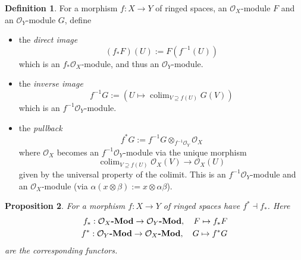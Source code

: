 \documentclass{scrartcl}
\newcommand{\Mod}[1]{\text{\textbf{$#1$-Mod}}}
\renewcommand{\O}{\mathcal{O}}
\DeclareMathOperator*{\colim}{colim}
\newtheorem{prop}{Proposition}[section]
\theoremstyle{definition}
\newtheorem{definition}[prop]{Definition}
\begin{document}
\begin{definition}
    For a morphism $f: X \to Y$ of ringed spaces, an $\O_X$-module $F$ and an $\O_Y$-module $G$, define
    \begin{itemize}
        \item the \emph{direct image}
        \begin{equation*}
            (f_*F)(U) := F(f^{-1}(U))
        \end{equation*}
        which is an $f_*\O_X$-module, and thus an $\O_Y$-module.
        \item the \emph{inverse image}
        \begin{equation*}
            f^{-1}G := \left( U \mapsto \colim_{V \supseteq f(U)} G(V) \right)
        \end{equation*}
        which is an $f^{-1}\O_Y$-module.
        \item the \emph{pullback}
        \begin{equation*}
            f^*G := f^{-1}G \otimes_{f^{-1}\O_Y} \O_X
        \end{equation*}
        where $\O_X$ becomes an $f^{-1}\O_Y$-module via the unique morphism
        \begin{equation*}
            \colim_{V \supseteq f(U)} \O_X(V) \to \O_X(U)
        \end{equation*}
        given by the universal property of the colimit.
        This is an $f^{-1}\O_Y$-module and an $\O_X$-module (via $\alpha(x \otimes \beta) := x \otimes \alpha \beta$).
    \end{itemize}
\end{definition}
\begin{prop}
    For a morphism $f: X \to Y$ of ringed spaces have $f^* \dashv f_*$.
    Here
    \begin{align*}
        f_*: \Mod{\O_X} \to \Mod{\O_Y}, \quad F \mapsto f_*F \\
        f^*: \Mod{\O_Y} \to \Mod{\O_X}, \quad G \mapsto f^*G
    \end{align*}
    are the corresponding functors.
\end{prop}
\end{document}
